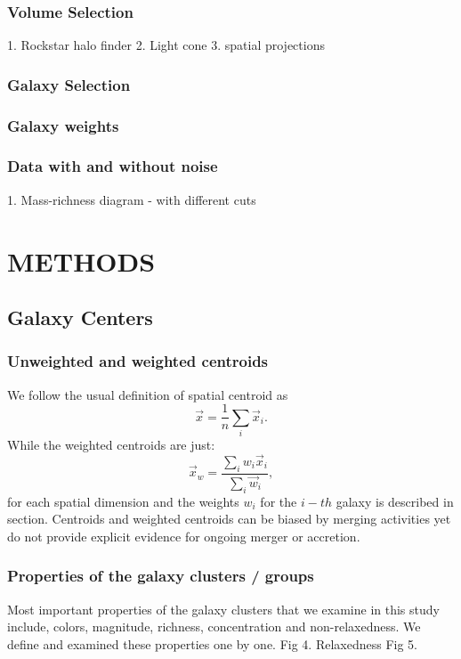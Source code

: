 \documentclass[letterpaper,useAMS,usenatbib]{mn2e}
\begin{document}
\subsubsection{Volume Selection}
1. Rockstar halo finder 
2. Light cone 
3. spatial projections 
\subsubsection{Galaxy Selection}
\subsubsection{Galaxy weights}
\subsubsection{Data with and without noise}
1. Mass-richness diagram - with different cuts  
\section{METHODS} 
\subsection{Galaxy Centers}
\subsubsection{Unweighted and weighted centroids}
We follow the usual definition of spatial centroid as 
\begin{equation}
	\vec{x} = \frac{1}{n} \sum_i \vec{x}_i. 
\end{equation}
While the weighted centroids are just: 
\begin{equation}
	\vec{x}_w = \frac{\sum_i w_i \vec{x}_i}{\sum_i \vec{w}_i},
\end{equation}
for each spatial dimension and the weights $w_i$ for the $i-th$ galaxy
is described in section.
Centroids and weighted centroids can be biased by merging activities yet do
not provide explicit evidence for ongoing merger or accretion. 

\subsubsection{Properties of the galaxy clusters / groups}
Most important properties of the galaxy clusters that we examine in this
study include, colors, magnitude, richness, concentration and non-relaxedness. We define
and examined these properties one by one. 
Fig 4. Relaxedness 
Fig 5. 
\end{document}
